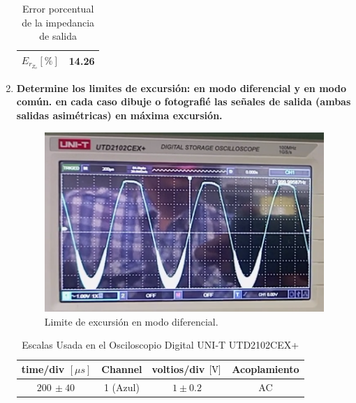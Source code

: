 \begin{enumerate}
        \begin{table}[H]
          \centering
          \begin{tabular}{|c|c|}
            \hline
            $E_{r_{Z_{o}}} [\%]$ & 14.26 \\
            \hline
          \end{tabular}
          \caption{Error porcentual de la impedancia de salida}
          \label{tab:error_porcentual2_zo}
        \end{table}


  \item \textbf{Determine los limites de excursión: en modo diferencial
          y en modo común. en cada caso dibuje o fotografié las señales de salida (ambas salidas asimétricas) en máxima excursión.}

        \begin{figure}[H]
          \centering
          \renewcommand{\figurename}{Imagen}
          \includegraphics[width=\textwidth]{Imagenes/vod.png}
          \caption{Limite de excursión en modo diferencial.}
          \label{fig:vod}
        \end{figure}

        \begin{table}[H]
          \centering
          \begin{tabular}{|c|c|c|c|}
            \hline
            \textbf{time/div} $[\mu s]$ & \textbf{Channel} & \textbf{voltios/div $[\volt]$} & \textbf{Acoplamiento} \\ \hline
            $200 \, \pm 40 \, $         & 1 (Azul)         & $1 \pm 0.2  $                  & AC                    \\ \hline
          \end{tabular}
          \caption{Escalas Usada en el Osciloscopio Digital UNI-T UTD2102CEX+}
          \label{tab:escala_lim_mododif}
        \end{table}


\end{enumerate}
